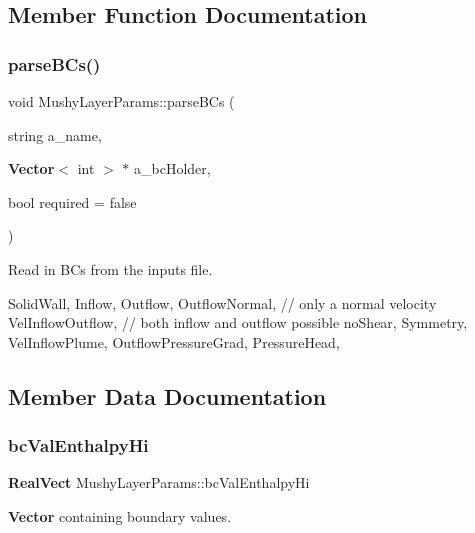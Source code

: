 \subsection{Member Function Documentation}
\mbox{\label{class_mushy_layer_params_a497dc7bd7c29819bd697d255af8de3d6}} 
\subsubsection{\texorpdfstring{parse\+B\+Cs()}{parseBCs()}}
{\footnotesize\ttfamily void Mushy\+Layer\+Params\+::parse\+B\+Cs (\begin{DoxyParamCaption}\item[{string}]{a\+\_\+name,  }\item[{\textbf{ Vector}$<$ int $>$ $\ast$}]{a\+\_\+bc\+Holder,  }\item[{bool}]{required = {\ttfamily false} }\end{DoxyParamCaption})}



Read in B\+Cs from the inputs file. 

Solid\+Wall, Inflow, Outflow, Outflow\+Normal, // only a normal velocity Vel\+Inflow\+Outflow, // both inflow and outflow possible no\+Shear, Symmetry, Vel\+Inflow\+Plume, Outflow\+Pressure\+Grad, Pressure\+Head,

\subsection{Member Data Documentation}
\mbox{\label{class_mushy_layer_params_a54544cff481fc73b80114133caeb08f4}} 
\subsubsection{\texorpdfstring{bc\+Val\+Enthalpy\+Hi}{bcValEnthalpyHi}}
{\footnotesize\ttfamily \textbf{ Real\+Vect} Mushy\+Layer\+Params\+::bc\+Val\+Enthalpy\+Hi}



\textbf{ Vector} containing boundary values. 

